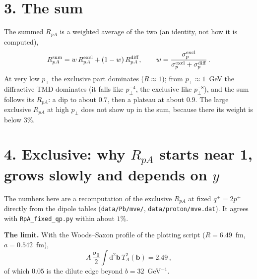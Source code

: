 \documentclass[12pt]{article}
\begin{document}
\section*{3. The sum}

The summed $R_{pA}$ is a weighted average of the two (an identity, not how it is computed),
\[
  R_{pA}^{\rm sum}=w\,R_{pA}^{\rm excl}+(1-w)\,R_{pA}^{\rm diff},\qquad
  w=\frac{\sigma_p^{\rm excl}}{\sigma_p^{\rm excl}+\sigma_p^{\rm diff}}\,.
\]
At very low $p_\perp$ the exclusive part dominates ($R\approx1$); from $p_\perp\approx1$~GeV the
diffractive TMD dominates (it falls like $p_\perp^{-4}$, the exclusive like $p_\perp^{-8}$), and the sum
follows its $R_{pA}$: a dip to about $0.7$, then a plateau at about $0.9$. The large exclusive
$R_{pA}$ at high $p_\perp$ does not show up in the sum, because there its weight is below $3\%$.

\section*{4. Exclusive: why $R_{pA}$ starts near 1, grows slowly and depends on $y$}

The numbers here are a recomputation of the exclusive $R_{pA}$ at fixed $q^+=2p^+$ directly from the
dipole tables (\texttt{data/Pb/mve/}, \texttt{data/proton/mve.dat}). It agrees with
\texttt{RpA\_fixed\_qp.py} within about $1\%$.

\textbf{The limit.} With the Woods--Saxon profile of the plotting script ($R=6.49$~fm, $a=0.542$~fm),
\[
  A\,\frac{\sigma_0}{2}\int\mathrm{d}^2\mathbf{b}\,T_A^2(\mathbf{b})=2.49\,,
\]
of which $0.05$ is the dilute edge beyond $b=32$~GeV$^{-1}$.
\end{document}
